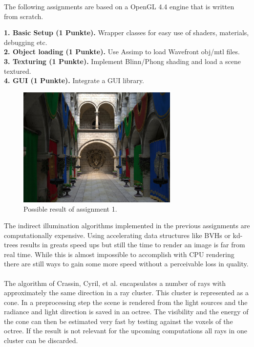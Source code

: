 \documentclass[A4paper]{gdv/gdv}
\newcommand{\teilaufgabe}[1]{\textbf{#1.}}
\begin{document}
\begin{gdvSheet}
  
\newcommand{\file}[1]{\texttt{#1}}
\newcommand{\code}[1]{\texttt{#1}}

The following assignments are based on a OpenGL 4.4 engine that is written from scratch. 

\teilaufgabe{1. Basic Setup (1 Punkte)} Wrapper classes for easy use of shaders, materials, debugging etc. \\
\teilaufgabe{2. Object loading (1 Punkte)} Use Assimp to load Wavefront obj/mtl files. \\
\teilaufgabe{3. Texturing (1 Punkte)} Implement Blinn/Phong shading and load a scene textured. \\
\teilaufgabe{4. GUI (1 Punkte)} Integrate a GUI library. \\

\begin{figure}[h]
\centering
\includegraphics[width=300px]{img/sponza.jpg}
\caption{Possible result of assignment 1.}
\end{figure}

The indirect illumination algorithms implemented in the previous assignments are computationally expensive. Using accelerating data structures like BVHs or kd-trees results in greats speed ups but still the time to render an image is far from real time. While this is almost impossible to accomplish with CPU rendering there are still ways to gain some more speed without a perceivable loss in quality. \\
\\
The algorithm of Crassin, Cyril, et al. encapsulates a number of rays with approximately the same direction in a ray cluster. This cluster is represented as a cone. In a preprocessing step the scene is rendered from the light sources and the radiance and light direction is saved in an octree. The visibility and the energy of the cone can then be estimated very fast by testing against the voxels of the octree. If the result is not relevant for the upcoming computations all rays in one cluster can be discarded.


\end{gdvSheet}
\end{document}
